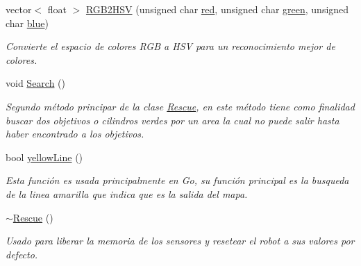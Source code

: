 \begin{DoxyCompactItemize}
vector$<$ float $>$ \hyperlink{classRescue_af2ba5b73069e7407f1bfc857a1ddae9c_af2ba5b73069e7407f1bfc857a1ddae9c}{R\+G\+B2\+H\+SV} (unsigned char \hyperlink{classRescue_af9ba54390762489e7f5c13ea8623b745_af9ba54390762489e7f5c13ea8623b745}{red}, unsigned char \hyperlink{classRescue_a5ec72c1115b4a89bd6079f74866b4717_a5ec72c1115b4a89bd6079f74866b4717}{green}, unsigned char \hyperlink{classRescue_adeb74390f710b4a180605f4a68e1bc77_adeb74390f710b4a180605f4a68e1bc77}{blue})
\begin{DoxyCompactList}\small\item\em Convierte el espacio de colores R\+GB a H\+SV para un reconocimiento mejor de colores. \end{DoxyCompactList}\item 
void \hyperlink{classRescue_a3ea9a01b97d0291afa704bff73564938_a3ea9a01b97d0291afa704bff73564938}{Search} ()
\begin{DoxyCompactList}\small\item\em Segundo método principar de la clase \hyperlink{classRescue}{Rescue}, en este método tiene como finalidad buscar dos objetivos o cilindros verdes por un area la cual no puede salir hasta haber encontrado a los objetivos. \end{DoxyCompactList}\item 
bool \hyperlink{classRescue_ab1ea1e98e62403dc681f26529805fe2a_ab1ea1e98e62403dc681f26529805fe2a}{yellow\+Line} ()
\begin{DoxyCompactList}\small\item\em Esta función es usada principalmente en Go, su función principal es la busqueda de la linea amarilla que indica que es la salida del mapa. \end{DoxyCompactList}\item 
\hyperlink{classRescue_a0330877161b533b15ea96b0daf85b692_a0330877161b533b15ea96b0daf85b692}{$\sim$\+Rescue} ()
\begin{DoxyCompactList}\small\item\em Usado para liberar la memoria de los sensores y resetear el robot a sus valores por defecto. \end{DoxyCompactList}\end{DoxyCompactItemize}
